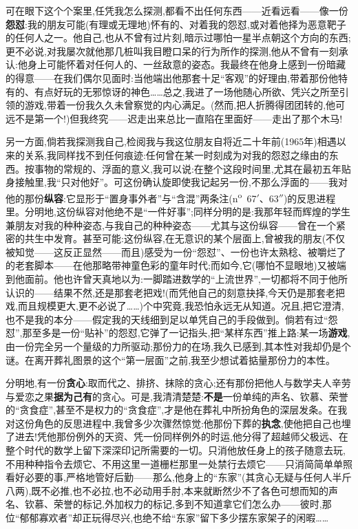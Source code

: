 可在眼下这个个案里,任凭我怎么探测,都看不出任何东西——近看远看——像一份\textbf{怨怼}:我的朋友可能(有理或无理地)怀有的、对着我的怨怼,或对着他择为恶意靶子的任何人之一。他自己,也从不曾有过片刻,暗示过哪怕一星半点朝这个方向的东西;更不必说,对我屡次就他那几桩叫我目瞪口呆的行为所作的探测,他从不曾有一刻承认:他身上可能怀着对任何人的、一丝敌意的姿态。我最终在他身上感到一份暗藏的得意——在我们偶尔见面时:当他端出他那套十足“客观”的好理由,带着那份他特有的、有点好玩的无邪惊讶的神色……总之,我进了一场他随心所欲、凭兴之所至引领的游戏,带着一份我久久未曾察觉的内心满足。(然而,把人折腾得团团转的,他可远不是第一个!)但我终究——迟走出来总比一直陷在里面好——走出了那个木马!

另一方面,倘若我探测我自己,检阅我与我这位\dmark{}朋友自将近二十年前(1965年)相遇以来的关系,我同样找不到任何痕迹:任何曾在某一时刻成为对我的怨怼之缘由的东西。按事物的常规的、浮面的意义,我可以说:在整个这段时间里,尤其在最初五年贴身接触里,我“只对他好”。可这份确认旋即使我记起另一份,不那么浮面的——我对他的那份\textbf{纵容}:它显形于“置身事外者”与“含混”两条注(n\textsuperscript{o}~67$'$、63$''$)的反思进程里。分明地,这份纵容对他绝不是“一件好事”;同样分明的是:我那年轻而辉煌的学生兼朋友对我的种种姿态,与我自己的种种姿态——尤其与这份纵容——曾在一个紧密的共生中发育。甚至可能:这份纵容,在无意识的某个层面上,曾被我的朋友(不仅被知觉——这反正显然——而且)感受为一份“怨怼”、一份也许太熟稔、被嚼烂了的老套脚本——在他那略带神童色彩的童年时代;而如今,它(哪怕不显眼地)又被端到他面前。他也许曾天真地以为:一脚踏进数学的“上流世界”,一切都将不同于他所认识的——结果不然,还是那套老把戏!(而凭他自己的刻意抉择,今天仍是那套老把戏,而且规模更大,更不必说了……)个中究竟,我恐怕永远无从知道。况且,把它澄清,也不是我的本分——假定我的天线细到足以单凭自己的手段做到。倘若有过“怨怼”,那至多是一份“贴补”的怨怼,它弹了一记指头,把“某样东西”推上路:某一场\textbf{游戏},由一份完全另一个量级的力所驱动;那份力的在场,我久已感到,其本性对我却仍是个谜。在离开葬礼图景的这个“第一层面”之前,我至少想试着掂量那份力的本性。

分明地,有一份\textbf{贪心}:取而代之、排挤、抹除的贪心;还有那份把他人与数学夫人辛劳与爱恋之果\textbf{据为己有}的贪心。可是,我清清楚楚:\textbf{不是}一份单纯的声名、钦慕、荣誉的“贪食症”,甚至不是权力的“贪食症”,才是他在葬礼中所扮角色的深层发条。在我对这份\dmark{}角色的反思进程中,我曾多少次骤然惊觉:他那份下葬的\textbf{执念},使他把自己也埋了进去!凭他那份例外的天资、凭一份同样例外的时运,他分得了超越师父极远、在整个时代的数学上留下深深印记所需要的一切。只消他放任身上的孩子随意去玩,不用种种指令去烦它、不用这里一道栅栏那里一处禁行去烦它——只消简简单单照看好必要的事,严格地管好后勤——那么,他身上的“东家”(其贪心无疑与任何人半斤八两),既不必推,也不必拉,也不必动用手肘,本来就断然少不了各色可想而知的声名、钦慕、荣誉的标记,外加权力的标记,多到不知道拿它们怎么办——彼时,那位“郁郁寡欢者”却正玩得尽兴,也绝不给“东家”留下多少摆东家架子的闲暇……


